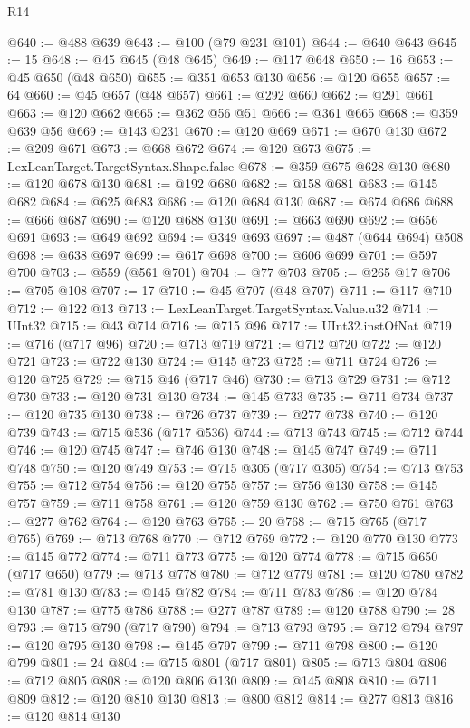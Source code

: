 \begin{lexlean}{R14}
\begin{coremodule}
@640 := @488 @639
@643 := @100 (@79 @231 @101)
@644 := @640 @643
@645 := 15
@648 := @45 @645 (@48 @645)
@649 := @117 @648
@650 := 16
@653 := @45 @650 (@48 @650)
@655 := @351 @653 @130
@656 := @120 @655
@657 := 64
@660 := @45 @657 (@48 @657)
@661 := @292 @660
@662 := @291 @661
@663 := @120 @662
@665 := @362 @56 @51
@666 := @361 @665
@668 := @359 @639 @56
@669 := @143 @231
@670 := @120 @669
@671 := @670 @130
@672 := @209 @671
@673 := @668 @672
@674 := @120 @673
@675 := LexLeanTarget.TargetSyntax.Shape.false
@678 := @359 @675 @628 @130
@680 := @120 @678 @130
@681 := @192 @680
@682 := @158 @681
@683 := @145 @682
@684 := @625 @683
@686 := @120 @684 @130
@687 := @674 @686
@688 := @666 @687
@690 := @120 @688 @130
@691 := @663 @690
@692 := @656 @691
@693 := @649 @692
@694 := @349 @693
@697 := @487 (@644 @694) @508
@698 := @638 @697
@699 := @617 @698
@700 := @606 @699
@701 := @597 @700
@703 := @559 (@561 @701)
@704 := @77 @703
@705 := @265 @17
@706 := @705 @108
@707 := 17
@710 := @45 @707 (@48 @707)
@711 := @117 @710
@712 := @122 @13
@713 := LexLeanTarget.TargetSyntax.Value.u32
@714 := UInt32
@715 := @43 @714
@716 := @715 @96
@717 := UInt32.instOfNat
@719 := @716 (@717 @96)
@720 := @713 @719
@721 := @712 @720
@722 := @120 @721
@723 := @722 @130
@724 := @145 @723
@725 := @711 @724
@726 := @120 @725
@729 := @715 @46 (@717 @46)
@730 := @713 @729
@731 := @712 @730
@733 := @120 @731 @130
@734 := @145 @733
@735 := @711 @734
@737 := @120 @735 @130
@738 := @726 @737
@739 := @277 @738
@740 := @120 @739
@743 := @715 @536 (@717 @536)
@744 := @713 @743
@745 := @712 @744
@746 := @120 @745
@747 := @746 @130
@748 := @145 @747
@749 := @711 @748
@750 := @120 @749
@753 := @715 @305 (@717 @305)
@754 := @713 @753
@755 := @712 @754
@756 := @120 @755
@757 := @756 @130
@758 := @145 @757
@759 := @711 @758
@761 := @120 @759 @130
@762 := @750 @761
@763 := @277 @762
@764 := @120 @763
@765 := 20
@768 := @715 @765 (@717 @765)
@769 := @713 @768
@770 := @712 @769
@772 := @120 @770 @130
@773 := @145 @772
@774 := @711 @773
@775 := @120 @774
@778 := @715 @650 (@717 @650)
@779 := @713 @778
@780 := @712 @779
@781 := @120 @780
@782 := @781 @130
@783 := @145 @782
@784 := @711 @783
@786 := @120 @784 @130
@787 := @775 @786
@788 := @277 @787
@789 := @120 @788
@790 := 28
@793 := @715 @790 (@717 @790)
@794 := @713 @793
@795 := @712 @794
@797 := @120 @795 @130
@798 := @145 @797
@799 := @711 @798
@800 := @120 @799
@801 := 24
@804 := @715 @801 (@717 @801)
@805 := @713 @804
@806 := @712 @805
@808 := @120 @806 @130
@809 := @145 @808
@810 := @711 @809
@812 := @120 @810 @130
@813 := @800 @812
@814 := @277 @813
@816 := @120 @814 @130

\end{coremodule}
\end{lexlean}
